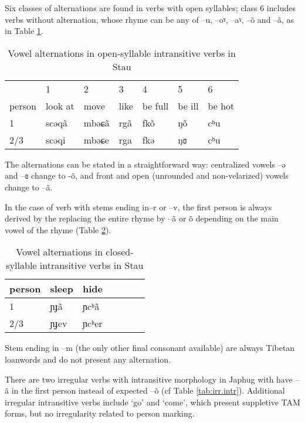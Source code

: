 \documentclass[oldfontcommands,oneside,a4paper,11pt]{article}
\newcommand{\ipa}[1]{{\phon #1}} %
\begin{document}
 
Six classes of alternations are found in verbs with open syllables; class 6 includes verbs without alternation, whose rhyme can be any of --\ipa{u}, --\ipa{oˠ}, --\ipa{aˠ}, --\ipa{õ} and --\ipa{ã}, as in Table \ref{tab:open.intr}.
\begin{table}[h]
\caption{Vowel alternations in open-syllable intransitive verbs in Stau} \label{tab:open.intr} \centering
\begin{tabular}{llll|ll|l}
\toprule
&1&2&3&4&5&6 \\
person &	look at   &  	move   &  	like&  	be full     &  	 	be ill      &  	be hot       \\  
\midrule
1&	\ipa{scəqã} & 	\ipa{mbəɕã} & \ipa{rgã} &	\ipa{fkõ} & 	  	\ipa{ŋõ} & 	   	\ipa{cʰu}   \\ 
2/3&	\ipa{scəqi} & 	\ipa{mbəɕe} & \ipa{rga} & 	\ipa{fkə} & 	  	\ipa{ŋɞ} & 	 	\ipa{cʰu}  \\ 
\bottomrule
\end{tabular}
\end{table}

The alternations can be stated in a straightforward way: centralized vowels  --\ipa{ə} and  --\ipa{ɞ} change to -\ipa{õ}, and front and open (unrounded and non-velarized) vowels change to --\ipa{ã}.

In the case of verb with stems ending in--\ipa{r} or --\ipa{v}, the first person is always derived by the replacing the entire rhyme by --\ipa{ã} or \ipa{õ} depending on the main vowel of the rhyme (Table \ref{tab:close.intr}).

\begin{table}[h]
\caption{Vowel alternations in closed-syllable intransitive verbs in Stau} \label{tab:close.intr} \centering
\begin{tabular}{llll|ll|l}
\toprule
person &	sleep   &  	hide   \\  
\midrule
1&	\ipa{ɲɟã} & 	\ipa{ɲcʰã} \\ 
2/3&	\ipa{ɲɟev} & 	\ipa{ɲcʰer} \\ 
\bottomrule
\end{tabular}
\end{table}
Stem ending in --\ipa{m} (the only other final consonant available) are always Tibetan loanwords and do not present any alternation.


There are two irregular verbs with intransitive morphology in Japhug with have \ipa{--ã} in the first person instead of expected \ipa{--õ} (cf Table \ref{tab:irr.intr}). Additional irregular intransitive verbs include `go' and `come', which present suppletive TAM forms, but no irregularity related to person marking.
\end{document}
